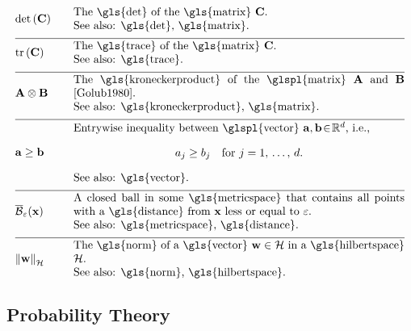 \newpage
\begin{align} 
	&\determinant{\mC} &\quad & \parbox{.85\textwidth}{The \gls{det} of the \gls{matrix} $\mC$.
		\\ See also: \gls{det}, \gls{matrix}. } \nonumber \\[2mm] \hline \nonumber\\[-5mm]
	&\tr{\mC} &\quad & \parbox{.85\textwidth}{The \gls{trace} of the \gls{matrix} $\mC$.
		\\ See also: \gls{trace}. } \nonumber \\[2mm] \hline \nonumber\\[-5mm]
	&\mathbf{A} \otimes \mathbf{B} &\quad & \parbox{.85\textwidth}{The \gls{kroneckerproduct} 
		of the \glspl{matrix} $\mathbf{A}$ and $\mathbf{B}$ \cite{Golub1980}.
		\\ See also: \gls{kroneckerproduct}, \gls{matrix}. }  \nonumber \\[2mm] \hline \nonumber\\[-5mm]
	&\va \geq \vb &\quad & \parbox{.85\textwidth}{Entrywise inequality between 
		\glspl{vector} $\va,\vb\!\in\!\mathbb{R}^{\featuredim}$, i.e.,
		$$a_{\featureidx} \geq b_{\featureidx} \quad \mbox{for }\featureidx=1,\,\ldots,\,\featuredim.$$
		See also: \gls{vector}. }  \nonumber \\[2mm] \hline \nonumber\\[-5mm]
	&\closedball{\featurevec}{\varepsilon} &\quad & \parbox{.85\textwidth}{A closed ball in some \gls{metricspace} 
		that contains all points with a \gls{distance} from $\featurevec$ less or equal to $\varepsilon$.
		\\ See also: \gls{metricspace}, \gls{distance}. } \nonumber \\[2mm] \hline \nonumber\\[-5mm]
	&\normgeneric{\weights}{\hilbertspace} &\quad & \parbox{.85\textwidth}{The \gls{norm} of a 
	 	\gls{vector} $\weights \in \hilbertspace$ in a \gls{hilbertspace} $\hilbertspace$.
		\\ See also: \gls{norm}, \gls{hilbertspace}. } \nonumber
\end{align} 



\newpage
\subsection*{Probability Theory} 

